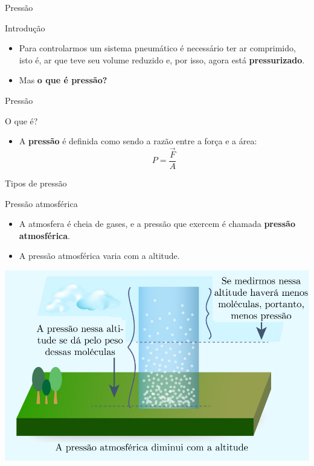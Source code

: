 \begin{frame}{Pressão}
\begin{block}{Introdução}
	\begin{itemize}
		\item Para controlarmos um sistema pneumático é necessário ter ar comprimido, isto é, ar que teve seu volume reduzido e, por isso, agora está \textbf{pressurizado}.
		\item Mas \textbf{o que é pressão?}
	\end{itemize}
\end{block}
\end{frame}


\begin{frame}{Pressão}
\begin{block}{O que é?}
	\begin{itemize}
		\item A \textbf{pressão} é definida como sendo a razão entre a força e a área: \[ P=\dfrac{\vec{F}}{A} \]
	\end{itemize}
\end{block}

\vspace{0.5cm}

\centering
{}
\end{frame}


\begin{frame}{Tipos de pressão}
	\begin{block}{Pressão atmosférica}
		\begin{itemize}
			\item A atmosfera é cheia de gases, e a pressão que exercem é chamada \textbf{pressão atmosférica}.
			\item A pressão atmosférica varia com a altitude.
		\end{itemize}
	\end{block}

\centering
\includegraphics[width=0.7\linewidth]{Figuras/Ch11/fig6n1}
\end{frame}


